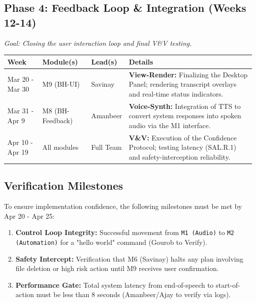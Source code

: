 \documentclass[12pt, titlepage]{article}
\begin{document}
\subsection{Phase 4: Feedback Loop \& Integration (Weeks 12-14)}
\textit{Goal: Closing the user interaction loop and final V\&V testing.}

\begin{tabularx}{\textwidth}{|>{\raggedright\arraybackslash}p{}|>{\raggedright\arraybackslash}p{}|>{\raggedright\arraybackslash}p{}|>{\raggedright\arraybackslash}X|}
\hline
\textbf{Week} & \textbf{Module(s)} & \textbf{Lead(s)} & \textbf{Details} \\ \hline
Mar 20 - Mar 30 & M9 (BH-UI) & Savinay & \textbf{View-Render:} Finalizing the Desktop Panel; rendering 
transcript overlays and real-time status indicators. \\ \hline
Mar 31 - Apr 9 & M8 (BH-Feedback) & Amanbeer & \textbf{Voice-Synth:} Integration of TTS to convert system 
responses into spoken audio via the M1 interface. \\ \hline
Apr 10 - Apr 19 & All modules & Full Team & \textbf{V\&V:} Execution of the Confidence Protocol; 
testing latency (SAL.R.1) and safety-interception reliability. \\ \hline
\end{tabularx}

\subsection{Verification Milestones}
To ensure implementation confidence, the following milestones must be met by 
Apr 20 - Apr 25:
\begin{enumerate}
    \item \textbf{Control Loop Integrity:} Successful movement from 
    \texttt{M1 (Audio)} to \texttt{M2 (Automation)} for a "hello world" command
    (Gourob to Verify).
    \item \textbf{Safety Intercept:} Verification that M6 (Savinay) halts any 
    plan involving file deletion or high risk action until M9 receives user 
    confirmation.
    \item \textbf{Performance Gate:} Total system latency from end-of-speech to 
    start-of-action must be less than 8 seconds (Amanbeer/Ajay to verify via logs).
\end{enumerate}





\newpage{}
\end{document}
